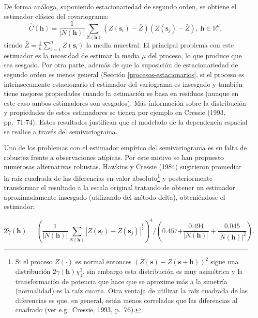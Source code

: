 \documentclass[
]{book}
\theoremstyle{break}
\theoremstyle{definition}
\theoremstyle{definition}
\theoremstyle{definition}
\theoremstyle{definition}
\theoremstyle{remark}
\begin{document}
De forma análoga, suponiendo estacionariedad de segundo orden, se obtiene el estimador clásico del covariograma:
\[\hat{C} (\mathbf{h}) = \dfrac{1}{\left| N(\mathbf{h})\right| }
\sum\limits_{N(\mathbf{h})}\left( Z(\mathbf{s}_{i})-\bar{Z} \right)
\left( Z(\mathbf{s}_{j})-\bar{Z} \right),\ \mathbf{h}\in \mathbb{R}^{d},\]
siendo \(\bar{Z} =\frac{1}{n} \sum_{i=1}^{n}Z(\mathbf{s}_{i})\) la media muestral.
El principal problema con este estimador es la necesidad de estimar la media \(\mu\) del proceso, lo que produce que sea sesgado.
Por otra parte, además de que la suposición de estacionariedad de segundo orden es menos general (Sección \ref{procesos-estacionarios}, si el proceso es intrínsecamente estacionario el estimador del variograma es insesgado y también tiene mejores propiedades cuando la estimación se basa en residuos (aunque en este caso ambos estimadores son sesgados).
Más información sobre la distribución y propiedades de estos estimadores se tienen por ejemplo en Cressie (1993, pp.~71-74).
Estos resultados justifican que el modelado de la dependencia espacial se realice a través del semivariograma.

Uno de los problemas con el estimador empírico del semivariograma es su falta de robustez frente a observaciones atípicas.
Por este motivo se han propuesto numerosas alternativas robustas.
Hawkins y Cressie (1984) sugirieron promediar la raíz cuadrada de las diferencias en valor absoluto\footnote{Si el proceso \(Z(\cdot)\) es normal entonces \((Z(\mathbf{s})-Z(\mathbf{s}+\mathbf{h}))^2\) sigue una distribución \(2\gamma(\mathbf{h})\chi_1^2\), sin embargo esta distribución es muy asimétrica y la transformación de potencia que hace que se aproxime más a la simetría (normalidad) es la raíz cuarta. Otra ventaja de utilizar la raíz cuadrada de las diferencias es que, en general, están menos correladas que las diferencias al cuadrado (ver e.g.~Cressie, 1993, p.~76).} y posteriormente transformar el resultado a la escala original tratando de obtener un estimador aproximadamente insesgado (utilizando del método delta), obteniéndose el estimador:

\[2\tilde{\gamma}(\mathbf{h}) = \left( \dfrac{1}{\left| N(\mathbf{h})\right| }
\sum\limits_{N(\mathbf{h})}\left| Z(\mathbf{s}_{i})-Z(\mathbf{s}_{j}
)\right|^{\frac{1}{2} } \right)^{4} /\left( \text{0.457+}
\dfrac{\text{0.494} }{\left| N(\mathbf{h})\right| } +\dfrac{\text{0.045}
}{\left| N(\mathbf{h})\right|^2 } \right).\]
\end{document}
